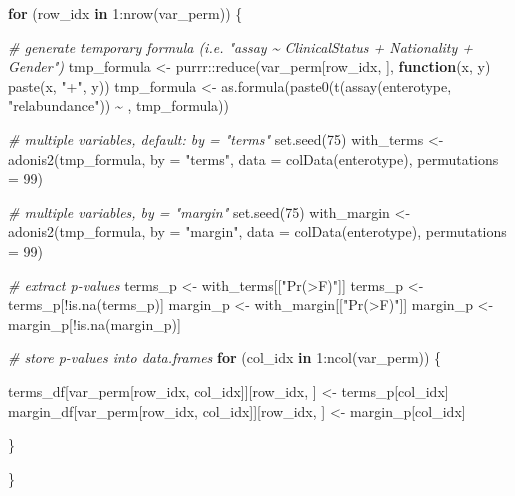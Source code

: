\documentclass[
]{book}
\newenvironment{Shaded}{\begin{snugshade}}{\end{snugshade}}
\newcommand{\AttributeTok}[1]{\textcolor[rgb]{0.77,0.63,0.00}{#1}}
\newcommand{\CommentTok}[1]{\textcolor[rgb]{0.56,0.35,0.01}{\textit{#1}}}
\newcommand{\ControlFlowTok}[1]{\textcolor[rgb]{0.13,0.29,0.53}{\textbf{#1}}}
\newcommand{\DecValTok}[1]{\textcolor[rgb]{0.00,0.00,0.81}{#1}}
\newcommand{\FunctionTok}[1]{\textcolor[rgb]{0.00,0.00,0.00}{#1}}
\newcommand{\NormalTok}[1]{#1}
\newcommand{\OtherTok}[1]{\textcolor[rgb]{0.56,0.35,0.01}{#1}}
\newcommand{\SpecialCharTok}[1]{\textcolor[rgb]{0.00,0.00,0.00}{#1}}
\newcommand{\StringTok}[1]{\textcolor[rgb]{0.31,0.60,0.02}{#1}}
\begin{document}
\begin{Shaded}
\begin{Highlighting}[]
\ControlFlowTok{for}\NormalTok{ (row\_idx }\ControlFlowTok{in} \DecValTok{1}\SpecialCharTok{:}\FunctionTok{nrow}\NormalTok{(var\_perm)) \{}
  
  \CommentTok{\# generate temporary formula (i.e. "assay \textasciitilde{} ClinicalStatus + Nationality + Gender")}
\NormalTok{  tmp\_formula }\OtherTok{\textless{}{-}}\NormalTok{ purrr}\SpecialCharTok{::}\FunctionTok{reduce}\NormalTok{(var\_perm[row\_idx, ], }\ControlFlowTok{function}\NormalTok{(x, y) }\FunctionTok{paste}\NormalTok{(x, }\StringTok{"+"}\NormalTok{, y))}
\NormalTok{  tmp\_formula }\OtherTok{\textless{}{-}} \FunctionTok{as.formula}\NormalTok{(}\FunctionTok{paste0}\NormalTok{(}\StringTok{\textquotesingle{}t(assay(enterotype, "relabundance")) \textasciitilde{} \textquotesingle{}}\NormalTok{,}
\NormalTok{                            tmp\_formula))}

  \CommentTok{\# multiple variables, default: by = "terms"}
  \FunctionTok{set.seed}\NormalTok{(}\DecValTok{75}\NormalTok{)}
\NormalTok{  with\_terms }\OtherTok{\textless{}{-}} \FunctionTok{adonis2}\NormalTok{(tmp\_formula, }
                \AttributeTok{by =} \StringTok{"terms"}\NormalTok{,}
                \AttributeTok{data =} \FunctionTok{colData}\NormalTok{(enterotype),}
                \AttributeTok{permutations =} \DecValTok{99}\NormalTok{)}
  
  \CommentTok{\# multiple variables, by = "margin"}
  \FunctionTok{set.seed}\NormalTok{(}\DecValTok{75}\NormalTok{)}
\NormalTok{  with\_margin }\OtherTok{\textless{}{-}} \FunctionTok{adonis2}\NormalTok{(tmp\_formula, }
                 \AttributeTok{by =} \StringTok{"margin"}\NormalTok{,}
                 \AttributeTok{data =} \FunctionTok{colData}\NormalTok{(enterotype),}
                 \AttributeTok{permutations =} \DecValTok{99}\NormalTok{)}

  \CommentTok{\# extract p{-}values}
\NormalTok{  terms\_p }\OtherTok{\textless{}{-}}\NormalTok{ with\_terms[[}\StringTok{"Pr(\textgreater{}F)"}\NormalTok{]]}
\NormalTok{  terms\_p }\OtherTok{\textless{}{-}}\NormalTok{ terms\_p[}\SpecialCharTok{!}\FunctionTok{is.na}\NormalTok{(terms\_p)]}
\NormalTok{  margin\_p }\OtherTok{\textless{}{-}}\NormalTok{ with\_margin[[}\StringTok{"Pr(\textgreater{}F)"}\NormalTok{]]}
\NormalTok{  margin\_p }\OtherTok{\textless{}{-}}\NormalTok{ margin\_p[}\SpecialCharTok{!}\FunctionTok{is.na}\NormalTok{(margin\_p)]}
  
  \CommentTok{\# store p{-}values into data.frames}
  \ControlFlowTok{for}\NormalTok{ (col\_idx }\ControlFlowTok{in} \DecValTok{1}\SpecialCharTok{:}\FunctionTok{ncol}\NormalTok{(var\_perm)) \{}
    
\NormalTok{    terms\_df[var\_perm[row\_idx, col\_idx]][row\_idx, ] }\OtherTok{\textless{}{-}}\NormalTok{ terms\_p[col\_idx]}
\NormalTok{    margin\_df[var\_perm[row\_idx, col\_idx]][row\_idx, ] }\OtherTok{\textless{}{-}}\NormalTok{ margin\_p[col\_idx]}
    
\NormalTok{  \}}
  
\NormalTok{\}}
\end{Highlighting}
\end{Shaded}
\end{document}
